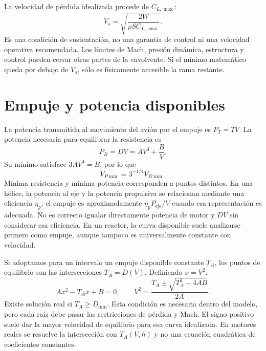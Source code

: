 La velocidad de pérdida idealizada procede de $C_{L,\max}$:
\begin{equation}
V_s=\sqrt{\frac{2W}{\rho S C_{L,\max}}}.
\end{equation}
Es una condición de sustentación, no una garantía de control ni una velocidad operativa recomendada. Los límites de Mach, presión dinámica, estructura y control pueden cerrar otras partes de la envolvente. Si el mínimo matemático queda por debajo de $V_s$, sólo es físicamente accesible la rama restante.

\section{Empuje y potencia disponibles}
La potencia transmitida al movimiento del avión por el empuje es $P_T=TV$. La potencia necesaria para equilibrar la resistencia es
\begin{equation}
P_R=DV=AV^3+\frac BV.
\end{equation}
Su mínimo satisface $3AV^4=B$, por lo que
\begin{equation}
V_{P\min}=3^{-1/4}V_{D\min}.
\end{equation}
Mínima resistencia y mínima potencia corresponden a puntos distintos. En una hélice, la potencia al eje y la potencia propulsiva se relacionan mediante una eficiencia $\eta_p$; el empuje es aproximadamente $\eta_pP_{\mathrm{eje}}/V$ cuando esa representación es adecuada. No es correcto igualar directamente potencia de motor y $DV$ sin considerar esa eficiencia. En un reactor, la curva disponible suele analizarse primero como empuje, aunque tampoco es universalmente constante con velocidad.

Si adoptamos para un intervalo un empuje disponible constante $T_A$, los puntos de equilibrio son las intersecciones $T_A=D(V)$. Definiendo $x=V^2$,
\begin{equation}\label{eq:11-roots}
Ax^2-T_Ax+B=0,\qquad
V^2=\frac{T_A\pm\sqrt{T_A^2-4AB}}{2A}.
\end{equation}
Existe solución real si $T_A\geq D_{\min}$. Esta condición es necesaria dentro del modelo, pero cada raíz debe pasar las restricciones de pérdida y Mach. El signo positivo suele dar la mayor velocidad de equilibrio para esa curva idealizada. En motores reales se resuelve la intersección con $T_A(V,h)$ y no una ecuación cuadrática de coeficientes constantes.

